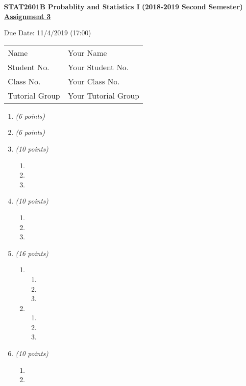 \documentclass[a4paper,11pt]{article}
\makeatletter
\newcommand{\info}[4]{
  \begin{center}
    {\bfseries \Large STAT2601B Probablity and Statistics I}
    {\bfseries (2018-2019 Second Semester)} \\
    \vspace*{3ex}
    {\bfseries \Large \underline{Assignment 3}}
  \end{center}
  Due Date: 11/4/2019 (17:00)
  \begin{flushleft}
  \begin{tabular}{@{}ll@{}}
    Name & #1 \\
    Student No. & #2 \\
    Class No. & #3 \\
    Tutorial Group & #4
  \end{tabular}
  \end{flushleft}
}
\makeatother
\begin{document}
  \info{Your Name}
       {Your Student No.}
       {Your Class No.}
       {Your Tutorial Group}
  \begin{enumerate}
    \item \textit{(6 points)}
    \item \textit{(6 points)}
    \item \textit{(10 points)}
    \begin{enumerate}
      \item
      \item
      \item
    \end{enumerate}
    \item \textit{(10 points)}
    \begin{enumerate}
      \item
      \item
      \item
    \end{enumerate}
    \item \textit{(16 points)}
    \begin{enumerate}
      \item
      \begin{enumerate}
        \item
        \item
        \item
      \end{enumerate}
      \item
      \begin{enumerate}
        \item
        \item
        \item
      \end{enumerate}
    \end{enumerate}
    \item \textit{(10 points)}
    \begin{enumerate}
      \item
      \item

\end{enumerate}
\end{enumerate}
\end{document}
